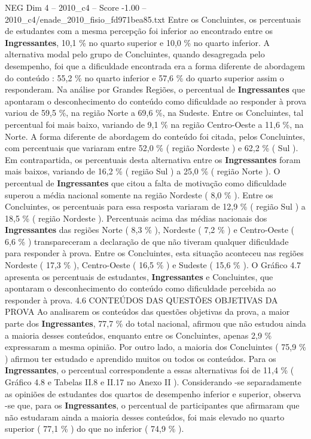 \begin{textsample}{NEG Dim 4 – 2010\_c4 – Score -1.00 – 2010\_c4/enade\_2010\_fisio\_fd971bea85.txt}
Entre os Concluintes, os percentuais de estudantes com a mesma percepção foi inferior ao encontrado entre os \textbf{Ingressantes}, 10,1 \% no quarto superior e 10,0 \% no quarto inferior.
A alternativa modal pelo grupo de Concluintes, quando desagregada pelo desempenho, foi que a dificuldade encontrada era a forma diferente de abordagem do conteúdo : 55,2 \% no quarto inferior e 57,6 \% do quarto superior assim o responderam.
Na análise por Grandes Regiões, o percentual de \textbf{Ingressantes} que apontaram o desconhecimento do conteúdo como dificuldade ao responder à prova variou de 59,5 \%, na região Norte a 69,6 \%, na Sudeste.
Entre os Concluintes, tal percentual foi mais baixo, variando de 9,1 \% na região Centro-Oeste a 11,6 \%, na Norte.
A forma diferente de abordagem do conteúdo foi citada, pelos Concluintes, com percentuais que variaram entre 52,0 \% ( região Nordeste ) e 62,2 \% ( Sul ).
Em contrapartida, os percentuais desta alternativa entre os \textbf{Ingressantes} foram mais baixos, variando de 16,2 \% ( região Sul ) a 25,0 \% ( região Norte ).
O percentual de \textbf{Ingressantes} que citou a falta de motivação como dificuldade superou a média nacional somente na região Nordeste ( 8,0 \% ).
Entre os Concluintes, os percentuais para essa resposta variaram de 12,9 \% ( região Sul ) a 18,5 \% ( região Nordeste ).
Percentuais acima das médias nacionais dos \textbf{Ingressantes} das regiões Norte ( 8,3 \% ), Nordeste ( 7,2 \% ) e Centro-Oeste ( 6,6 \% ) transpareceram a declaração de que não tiveram qualquer dificuldade para responder à prova.
Entre os Concluintes, esta situação aconteceu nas regiões Nordeste ( 17,3 \% ), Centro-Oeste ( 16,5 \% ) e Sudeste ( 15,6 \% ).
O Gráfico 4.7 apresenta os percentuais de estudantes, \textbf{Ingressantes} e Concluintes, que apontaram o desconhecimento do conteúdo como dificuldade percebida ao responder à prova. 4.6 CONTEÚDOS DAS QUESTÕES OBJETIVAS DA PROVA Ao analisarem os conteúdos das questões objetivas da prova, a maior parte dos \textbf{Ingressantes}, 77,7 \% do total nacional, afirmou que não estudou ainda a maioria desses conteúdos, enquanto entre os Concluintes, apenas 2,9 \% expressaram a mesma opinião.
Por outro lado, a maioria dos Concluintes ( 75,9 \% ) afirmou ter estudado e aprendido muitos ou todos os conteúdos.
Para os \textbf{Ingressantes}, o percentual correspondente a essas alternativas foi de 11,4 \% ( Gráfico 4.8 e Tabelas II.8 e II.17 no Anexo II ).
Considerando -se separadamente as opiniões de estudantes dos quartos de desempenho inferior e superior, observa -se que, para os \textbf{Ingressantes}, o percentual de participantes que afirmaram que não estudaram ainda a maioria desses conteúdos, foi mais elevado no quarto superior ( 77,1 \% ) do que no inferior ( 74,9 \% ).

\end{textsample}
